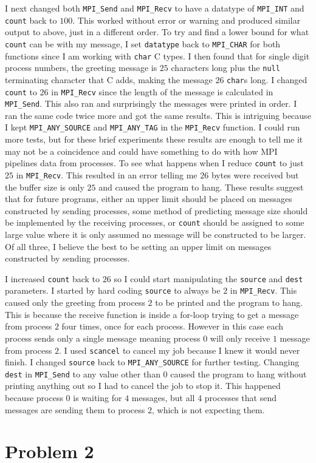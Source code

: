 \documentclass[11pt]{article}
\begin{document}
	I next changed both \texttt{MPI\_Send} and \texttt{MPI\_Recv} to have a datatype of \texttt{MPI\_INT} and \texttt{count} back to $100$. This worked without error or warning and produced similar output to above, just in a different order. To try and find a lower bound for what \texttt{count} can be with my message, I set \texttt{datatype} back to \texttt{MPI\_CHAR} for both functions since I am working with \texttt{char} C types. I then found that for single digit process numbers, the greeting message is $25$ characters long plus the \texttt{null} terminating character that C adds, making the message $26$ \texttt{char}s long. I changed \texttt{count} to $26$ in \texttt{MPI\_Recv} since the length of the message is calculated in \texttt{MPI\_Send}. This also ran and surprisingly the messages were printed in order. I ran the same code twice more and got the same results. This is intriguing because I kept \texttt{MPI\_ANY\_SOURCE} and \texttt{MPI\_ANY\_TAG} in the \texttt{MPI\_Recv} function. I could run more tests, but for these brief experiments these results are enough to tell me it may not be a coincidence and could have something to do with how MPI pipelines data from processes. To see what happens when I reduce \texttt{count} to just $25$ in \texttt{MPI\_Recv}. This resulted in an error telling me $26$ bytes were received but the buffer size is only $25$ and caused the program to hang. These results suggest that for future programs, either an upper limit should be placed on messages constructed by sending processes, some method of predicting message size should be implemented by the receiving processes, or \texttt{count} should be assigned to some large value where it is only assumed no message will be constructed to be larger. Of all three, I believe the best to be setting an upper limit on messages constructed by sending processes.
	
	I increased \texttt{count} back to $26$ so I could start manipulating the \texttt{source} and \texttt{dest} parameters. I started by hard coding \texttt{source} to always be $2$ in \texttt{MPI\_Recv}. This caused only the greeting from process $2$ to be printed and the program to hang. This is because the receive function is inside a for-loop trying to get a message from process $2$ four times, once for each process. However in this case each process sends only a single message meaning process $0$ will only receive $1$ message from process $2$. I used \texttt{scancel} to cancel my job because I knew it would never finish. I changed \texttt{source} back to \texttt{MPI\_ANY\_SOURCE} for further testing. Changing \texttt{dest} in \texttt{MPI\_Send} to any value other than $0$ caused the program to hang without printing anything out so I had to cancel the job to stop it. This happened because process $0$ is waiting for $4$ messages, but all $4$ processes that send messages are sending them to process $2$, which is not expecting them.
	
	
	

\pagebreak
\section{Problem 2}
\end{document}
